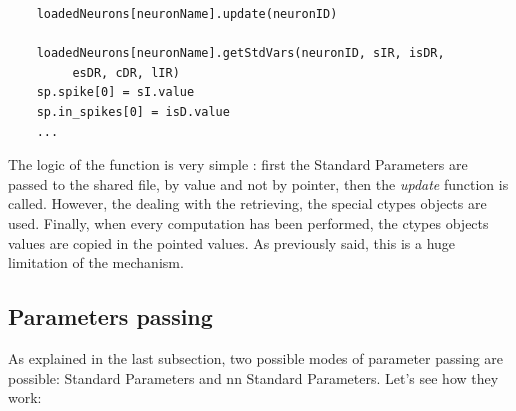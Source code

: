 \documentclass{article}
\begin{document}
\begin{itemize}
\begin{verbatim}
    loadedNeurons[neuronName].update(neuronID)

    loadedNeurons[neuronName].getStdVars(neuronID, sIR, isDR, 
         esDR, cDR, lIR)
    sp.spike[0] = sI.value
    sp.in_spikes[0] = isD.value
    ...
\end{verbatim}
The logic of the function is very simple : first the Standard Parameters are passed to the shared file, by value and not by pointer, then the \emph{update} function is called. However, the dealing with the retrieving, the special ctypes objects are used. Finally, when every computation has been performed, the ctypes objects values are copied in the pointed values. As previously said, this is a huge limitation of the mechanism.
\end{itemize}

\subsection{Parameters passing}
As explained in the last subsection, two possible modes of parameter passing are possible: Standard Parameters and nn Standard Parameters. Let's see how they work:
\end{document}
